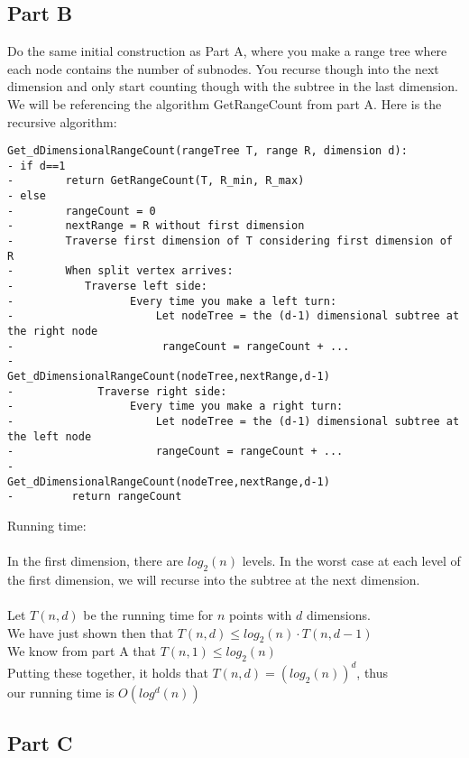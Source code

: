 \documentclass[11pt,psfig]{article}
\begin{document}
\subsection*{Part B}

Do the same initial construction as Part A, where you make a range tree where each node contains the number of subnodes. You recurse though into the next dimension and only start counting though with the subtree in the last dimension. We will be referencing the algorithm GetRangeCount from part A. Here is the recursive algorithm:\\

\begin{verbatim}
Get_dDimensionalRangeCount(rangeTree T, range R, dimension d):
- if d==1
-	     return GetRangeCount(T, R_min, R_max)
- else
-	     rangeCount = 0
-	     nextRange = R without first dimension
-	     Traverse first dimension of T considering first dimension of R
-	     When split vertex arrives:
-           Traverse left side:
-	               Every time you make a left turn:
-	                   Let nodeTree = the (d-1) dimensional subtree at the right node
-	                    rangeCount = rangeCount + ...
-	                      Get_dDimensionalRangeCount(nodeTree,nextRange,d-1)
-	          Traverse right side:
-	               Every time you make a right turn:
-	                   Let nodeTree = the (d-1) dimensional subtree at the left node
-	                   rangeCount = rangeCount + ...
-		                    Get_dDimensionalRangeCount(nodeTree,nextRange,d-1)
-	      return rangeCount

\end{verbatim}
Running time:\\
\\
In the first dimension, there are $log_2(n)$ levels. In the worst case at each level of the first dimension, we will recurse into the subtree at the next dimension. \\
\\
Let $T(n,d)$ be the running time for $n$ points with $d$ dimensions. \\
We have just shown then that $T(n,d) \leq log_2(n) \cdot T(n,d-1)$ \\
We know from part A that $T(n,1) \leq log_2(n)$\\
Putting these together, it holds that $T(n,d) = (log_2(n))^d$, thus \\
our running time is $O(log^d(n))$

\subsection*{Part C}
\end{document}
